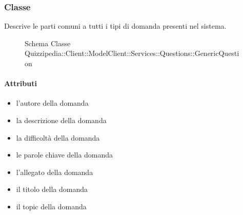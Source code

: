 \subsubsection{Classe }
Descrive le parti comuni a tutti i tipi di domanda presenti nel sistema.
\begin{figure}[H]
\centering
\noindent{}
\caption[Schema Classe GenericQuestion]{Schema Classe Quizzipedia::Client::ModelClient::Services::Questions::GenericQuestion}
\end{figure}
\paragraph{Attributi}
\begin{itemize}
\item {}
\newline
l'autore della domanda
\item {}
\newline
la descrizione della domanda
\item {}
\newline
la difficoltà della domanda
\item {}
\newline
le parole chiave della domanda
\item {}
\newline
l'allegato della domanda
\item {}
\newline
il titolo della domanda
\item {}
\newline
il topic della domanda
\end{itemize}
